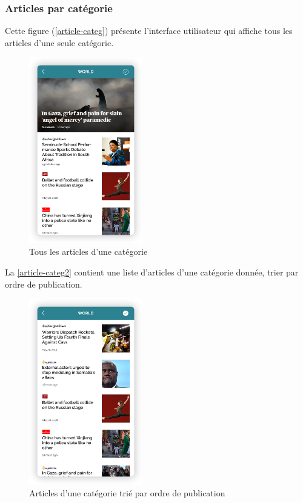 \subsubsection{Articles par catégorie}
Cette figure (\autoref{article-categ}) présente l'interface utilisateur qui affiche tous les articles d'une seule catégorie. 
\begin{figure}[H]
    \centering
    \includegraphics[width=140pt]{img/chapter4/feedny/en-categ-articles1.png}
    \caption{Tous les articles d'une catégorie}
    \label{article-categ}
\end{figure}

La \autoref{article-categ2} contient une liste d'articles d'une catégorie donnée, trier par ordre de publication.
\begin{figure}[H]
    \centering
    \includegraphics[width=140pt]{img/chapter4/feedny/en-categ-articles.png}
    \caption{Articles d'une catégorie trié par ordre de publication}
    \label{article-categ2}
\end{figure}

